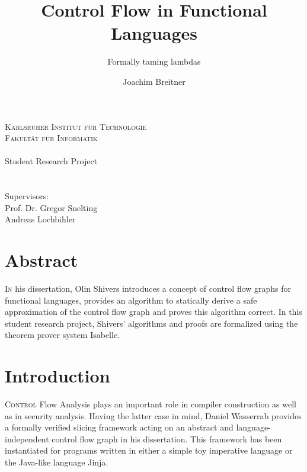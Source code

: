 \documentclass[a4paper,parskip=half,BCOR=8mm,DIV=calc,12pt]{scrbook}
\author{Joachim Breitner}
\title{Control Flow in Functional Languages}
\subtitle{Formally taming lambdas}
\begin{document}
\begin{titlepage}
\centering
\makeatletter
\textsc{\Large{Karlsruher Institut für Technologie}}\\
\vspace{.5em}
\textsc{\Large{Fakultät für Informatik}} \\
\vspace{4em}
{\Large \@author} \\
\vspace{2em}
{\large Student Research Project}\\
\vspace{2.5em}
{\sectfont\LARGE \@title }\\
\vspace{2em}
{\sectfont\Large \@subtitle }\\
\vfill
Supervisors: \\
Prof. Dr. Gregor Snelting \\
Andreas Lochbihler \\
\vspace{2em}
{\@date }
\makeatother
\end{titlepage}


\chapter*{Abstract}

\lettrine I{n} his dissertation\cite{Shivers}, Olin Shivers introduces a concept of control flow graphs for functional languages, provides an algorithm to statically derive a safe approximation of the control flow graph and proves this algorithm correct. In this student research project, Shivers’ algorithms and proofs are formalized using the theorem prover system Isabelle.


\tableofcontents
\enlargethispage{2em}

\chapter{Introduction}

\lettrine C{ontrol} Flow Analysis plays an important role in compiler construction as well as in security analysis. Having the latter case in mind, Daniel Wasserrab provides a formally verified slicing framework acting on an abstract and language-independent control flow graph in his dissertation\citep{wasserrab}. This framework has been instantiated for programs written in either a simple toy imperative language  or the Java-like language Jinja\citep{jinja}.
\end{document}
